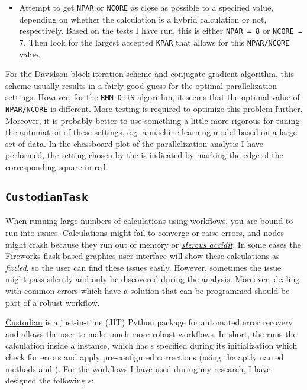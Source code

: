\begin{refsection}
\begin{itemize}
\item Attempt to get \texttt{NPAR} or \texttt{NCORE} as close as possible to a 
specified value, depending on whether the calculation is a hybrid calculation 
or not, respectively. Based on the tests I have run, this is either 
\texttt{NPAR = 8} or \texttt{NCORE = 7}. Then look for the largest accepted 
\texttt{KPAR} that allows for this \texttt{NPAR/NCORE} value. 
 
\end{itemize} 
 
For the \href{https://joshuagoings.com/2013/08/23/davidsons-method/}{Davidson 
block iteration scheme} and conjugate gradient algorithm, this scheme usually 
results in a fairly good guess for the optimal parallelization settings. 
However, for the \texttt{RMM-DIIS} algorithm, it seems that 
the optimal value of \texttt{NPAR/NCORE} is different. More testing is 
required to optimize this problem further. Moreover, it is probably better to 
use something a little more rigorous for tuning the automation of these 
settings, e.g. a machine learning model based on a large set of data. In 
the chessboard plot of 
\href{https://mybinder.org/v2/gh/mbercx/jupyter/master?filepath=parallel\%2Fparallel_analysis.ipynb}{the 
parallelization analysis} I have performed, the setting chosen by the 
 is indicated by marking the edge of the corresponding square in red. 
 
\subsection{\texttt{CustodianTask}} \label{automation:sec-CustodianTask} 
 
When running large numbers of calculations using workflows, you are bound to 
run into issues. Calculations might fail to converge or raise errors, and 
nodes might crash because they run out of memory or 
\href{https://www.urbandictionary.com/define.php?term=stercus\%20accidit}{\textcolor{black}{\textit{stercus 
accidit}}}. In some cases the Fireworks flask-based graphics user interface 
will show these calculations as \textit{fizzled}, so the user can find these 
issues easily. However, sometimes the issue might pass silently and only be 
discovered during the analysis. Moreover, dealing with common errors which 
have a solution that can be programmed should be part of a robust workflow. 
 
\href{https://materialsproject.github.io/custodian/}{Custodian} is a 
just-in-time (JIT) Python package for automated error recovery and allows the 
user to make much more robust workflows. In short, the  
runs the calculation inside a  instance, which has 
s specified during its initialization which check for 
errors and apply pre-configured corrections (using the aptly named methods 
 and ). For the workflows I have used during my 
research, I have designed the following s: 
 

\end{refsection}
